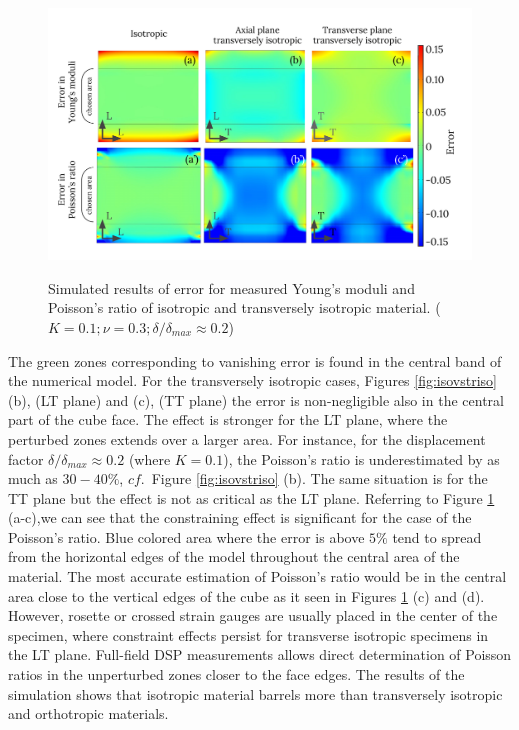 \documentclass[3p]{elsarticle}
\begin{document}
\begin{figure}[h]
\centering
\includegraphics[width=\textwidth]{BarellingError.pdf}
\label{fig:Error}
\caption{\label{fig:Error} Simulated results of error for measured Young's
moduli and Poisson's ratio of isotropic and transversely isotropic
material. ($K=0.1; \nu=0.3; \delta/\delta_{max}\approx0.2$)}

\end{figure}

The green zones corresponding to vanishing error is found in the central band of
the numerical model. For the transversely isotropic cases, Figures
\ref{fig:isovstriso} (b\textprime), (LT plane) and (c\textprime), (TT plane) the error is
non-negligible also in the central part of the cube face. The effect is stronger for the LT plane, where the perturbed zones extends over a larger area.
For instance, for the displacement factor $\delta/\delta_{max}\approx0.2 $ (where $K=0.1$),  the Poisson's ratio is
underestimated by as much as $30-40\%$, $cf.$\ Figure \ref{fig:isovstriso}
(b\textprime).
The same situation is for the TT plane  but the effect is not as critical as the LT plane.
Referring to Figure \ref{fig:Error} (a\textprime-c\textprime),we can see that
the constraining effect is significant for the case of the Poisson's ratio. Blue colored area where the error is above $5\%$ tend to spread from the horizontal edges of 
the model throughout the central area of the material. The most accurate
estimation of Poisson's ratio would be in the central area close to the vertical
edges of the cube as it seen in Figures \ref{fig:Error} (c\textprime) and
(d\textprime).
However, rosette or crossed strain gauges are usually placed in the center of the specimen, where constraint effects persist for transverse isotropic specimens in the LT plane. Full-field DSP measurements allows direct determination of Poisson ratios in the unperturbed zones closer to the face edges. 
The results of the simulation shows that isotropic material barrels more than transversely isotropic and orthotropic materials. \\	
\end{document}

